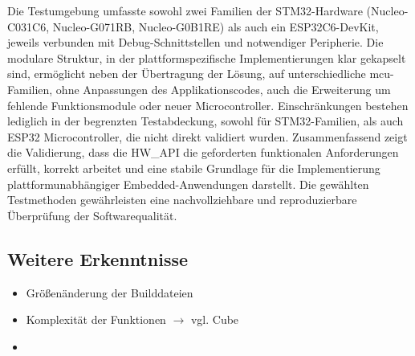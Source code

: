 Die Testumgebung umfasste sowohl zwei Familien der STM32-Hardware (Nucleo-C031C6, Nucleo-G071RB, Nucleo-G0B1RE) als auch ein ESP32C6-DevKit, jeweils verbunden mit Debug-Schnittstellen und notwendiger Peripherie.
Die modulare Struktur, in der plattformspezifische Implementierungen klar gekapselt sind, ermöglicht neben der Übertragung der Lösung, auf unterschiedliche \gls{mcu}-Familien, ohne Anpassungen des Applikationscodes, auch die Erweiterung um fehlende Funktionsmodule oder neuer Microcontroller.
Einschränkungen bestehen lediglich in der begrenzten Testabdeckung, sowohl für STM32-Familien, als auch ESP32 Microcontroller, die nicht direkt validiert wurden.
Zusammenfassend zeigt die Validierung, dass die HW\_API die geforderten funktionalen Anforderungen erfüllt, korrekt arbeitet und eine stabile Grundlage für die Implementierung plattformunabhängiger Embedded-Anwendungen darstellt. 
Die gewählten Testmethoden gewährleisten eine nachvollziehbare und reproduzierbare Überprüfung der Softwarequalität.


\subsection{Weitere Erkenntnisse}
\begin{itemize}
	\item Größenänderung der Builddateien
	\item Komplexität der Funktionen $\rightarrow$ vgl. Cube
	\item 
\end{itemize}







































